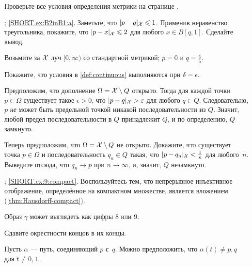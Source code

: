 \setcounter{eqtn}{0}

\raggedcolumns\setlength{\multicolsep}{-4mm}
\begin{multicols}{2}

Проверьте все условия определения метрики на странице \pageref{page:def:metric}.

\parbf{\ref{ex:B2inB1}}; \ref{SHORT.ex:B2inB1:a}.
Заметьте, что $\dist{p}{q}{\spc{X}}\le 1$.
Применив неравенство треугольника, покажите, что $\dist{p}{x}{\spc{X}}\le 2$ для любого $x\in B[q,1]$.
Сделайте вывод. 

Возьмите за $\mathcal{X}$ луч $[0,\infty)$ со стандартной метрикой; $p=0$ и $q=\tfrac45$.

Покажите, что условия в \ref{def:continuous} выполняются при $\delta=\epsilon$.

Предположим, что дополнение $\Omega=\mathcal{X}\setminus Q$ открыто.
Тогда для каждой точки $p\in \Omega$ существует такое $\epsilon>0$, что $\dist{p}{q}{\spc{X}}>\epsilon$ для любого $q\in Q$.
Следовательно, $p$ \textit{не} может быть предельной точкой никакой последовательности из $Q$.
Значит, любой предел последовательности в $Q$ принадлежит $Q$,
и по определению, $Q$ замкнуто.

Теперь предположим, что $\Omega=\mathcal{X}\setminus Q$ не открыто.
Докажите, что существует точка $p\in \Omega$ и последовательность $q_n\in Q$ такая, что $\dist{p}{q_n}{\spc{X}}<\tfrac 1n$ для любого~$n$.
Выведите отсюда, что $q_n\to p$ при $n\to \infty$, и, значит, $Q$ незамкнуто.



\setcounter{eqtn}{0}

\parbf{\ref{ex:9}}; \ref{SHORT.ex:9:compact}.
Воспользуйтесь тем, что непрерывное инъективное отображение, определённое на компактном множестве, является вложением (\ref{thm:Hausdorff-compact}).

Образ $\gamma$ может выглядеть как цифры $8$ или $9$.

Сдавите окрестности концов в их концы.

Пусть $\alpha$ --- путь, соединяющий $p$ с~$q$.
Можно предположить, что $\alpha(t)\ne p,q$ для $t\ne0,1$.


\end{multicols}
